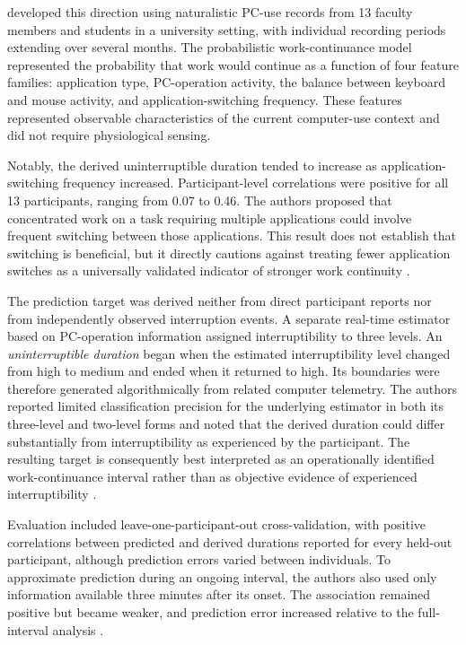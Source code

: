 \textcite{shiratori2020workContinuance} developed this direction using naturalistic PC-use records from 13 faculty members and students in a university setting, with individual recording periods extending over several months. The probabilistic work-continuance model represented the probability that work would continue as a function of four feature families: application type, PC-operation activity, the balance between keyboard and mouse activity, and application-switching frequency. These features represented observable characteristics of the current computer-use context and did not require physiological sensing.

Notably, the derived uninterruptible duration tended to increase as application-switching frequency increased. Participant-level correlations were positive for all 13 participants, ranging from 0.07 to 0.46. The authors proposed that concentrated work on a task requiring multiple applications could involve frequent switching between those applications. This result does not establish that switching is beneficial, but it directly cautions against treating fewer application switches as a universally validated indicator of stronger work continuity \parencite{shiratori2020workContinuance}.

The prediction target was derived neither from direct participant reports nor from independently observed interruption events. A separate real-time estimator based on PC-operation information assigned interruptibility to three levels. An \emph{uninterruptible duration} began when the estimated interruptibility level changed from high to medium and ended when it returned to high. Its boundaries were therefore generated algorithmically from related computer telemetry. The authors reported limited classification precision for the underlying estimator in both its three-level and two-level forms and noted that the derived duration could differ substantially from interruptibility as experienced by the participant. The resulting target is consequently best interpreted as an operationally identified work-continuance interval rather than as objective evidence of experienced interruptibility \parencite{shiratori2020workContinuance}.

Evaluation included leave-one-participant-out cross-validation, with positive correlations between predicted and derived durations reported for every held-out participant, although prediction errors varied between individuals. To approximate prediction during an ongoing interval, the authors also used only information available three minutes after its onset. The association remained positive but became weaker, and prediction error increased relative to the full-interval analysis \parencite{shiratori2020workContinuance}.

